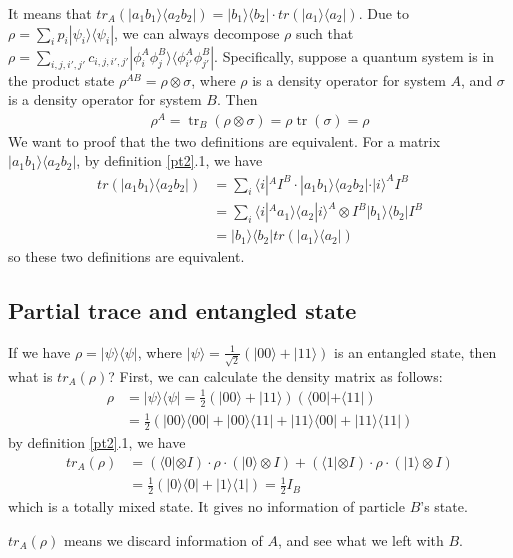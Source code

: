 \documentclass[UTF8,12pt]{article} %
\begin{document}
It means that $tr_{A}(|a_{1}b_{1}\rangle\langle a_{2}b_{2}|) = |b_{1}\rangle\langle b_{2}| \cdot tr(|a_{1}\rangle\langle a_{2}|)$. Due to $\rho = \sum_{i}p_{i}|\psi_{i}\rangle\langle\psi_{i}|$, we can always decompose $\rho$ such that $\rho = \sum_{i,j,i',j'} c_{i,j,i',j'} |\phi_{i}^{A} \phi_{j}^{B}\rangle\langle\phi_{i'}^{A} \phi_{j'}^{B}|$. Specifically, suppose a quantum system is in the product state $\rho^{AB} = \rho \otimes \sigma$, where $\rho$ is a density operator for system $A$, and $\sigma$ is a density operator for system $B$. Then
\begin{align}
\rho^{A}=\operatorname{tr}_{B}(\rho \otimes \sigma)=\rho \operatorname{tr}(\sigma)=\rho
\end{align}
We want to proof that the two definitions are equivalent. For a matrix $|a_{1}b_{1}\rangle\langle a_{2}b_{2}|$, by definition \ref{pt2}.1, we have
\begin{align}
tr(|a_{1}b_{1}\rangle\langle a_{2}b_{2}|) &= \sum_{i} \langle i|^{A} I^{B}\cdot |a_{1}b_{1}\rangle\langle a_{2}b_{2}| \cdot |i\rangle^{A} I^{B} \\
&= \sum_{i} \langle i|^{A}a_{1}\rangle\langle a_{2}|i\rangle^{A} \otimes I^{B} |b_{1}\rangle\langle b_{2}| I^{B}\\
&= |b_{1}\rangle\langle b_{2}|tr(|a_{1}\rangle\langle a_{2}|)
\end{align}
so these two definitions are equivalent.

\subsection{Partial trace and entangled state}

If we have $\rho = |\psi\rangle\langle\psi|$, where $|\psi\rangle = \frac{1}{\sqrt{2}}(|00\rangle + |11\rangle)$ is an entangled state, then what is $tr_{A}(\rho)$? First, we can calculate the density matrix as follows:
\begin{align}
\rho &= |\psi\rangle\langle\psi| = \frac{1}{2}(|00\rangle + |11\rangle)(\langle 00| + \langle 11|) \\
&= \frac{1}{2}(|00\rangle\langle00| + |00\rangle\langle11| + |11\rangle\langle00| + |11\rangle\langle11|)
\end{align}
by definition \ref{pt2}.1, we have
\begin{align}
tr_{A}(\rho) &= (\langle0|\otimes I) \cdot \rho \cdot (|0\rangle \otimes I) + (\langle1|\otimes I) \cdot \rho \cdot (|1\rangle \otimes I) \\
&= \frac{1}{2}(|0\rangle\langle0| + |1\rangle\langle1|) = \frac{1}{2} I_{B}
\end{align}
which is a totally mixed state. It gives no information of particle $B$'s state.

\begin{center}
\end{center}

$tr_{A}(\rho)$ means we discard information of $A$, and see what we left with $B$.
\end{document}
